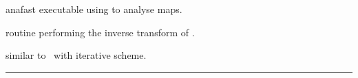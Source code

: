 \begin{related}
  \begin{sulist}{} %
  \item[anafast] executable using \thedocid to analyse maps.
  \item[\htmlref{alm2map}{sub:alm2map}] routine performing the inverse transform
of \thedocid.
  \item[\htmlref{map2alm\_iterative}{sub:map2alm_iterative}] similar to
\thedocid\ with iterative scheme.
  \end{sulist}
\end{related}

\rule{\hsize}{2mm}

\newpage
